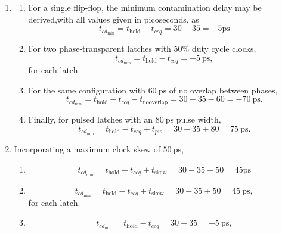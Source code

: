 \documentclass{article}
\begin{document}
\begin{enumerate}[label=\thesubsection]
\begin{enumerate}[label=\alph*)]
		\item For two transparent latches, clock skew has no impact on performance, and so 
			\[
				t_{pd_{\mathrm{max}}} = 2t_{pdq} = 420 \ \mathrm{ps}.
			\]
		\item For pulsed latches, though they are similarly skew-tolerant, this only applies if the pulse is wide enough. In this case, \(t_{pdq}\) is less than the total sequencing overhead, the latches are not \textit{totally} skew-tolerant, and so
			\[
				t_{pd_{\mathrm{max}}} = T_C - (t_{pcq}+t_{\mathrm{setup}} - t_{pw}+t_{\mathrm{skew}}) = 500 - (50 + 25 - 80 + 50) = 500 - 45 = 455 \ \mathrm{ps}.
			\]
	\end{enumerate}
	\setcounter{subsection}{3}
	\item
		\begin{enumerate}[label=\alph*)]
			\item For a single flip-flop, the minimum contamination delay may be derived,with all values given in picoseconds, as
				\[
					t_{cd_{\mathrm{min}}} = t_{\mathrm{hold}} - t_{ccq} = 30-35 = -5 \mathrm{ps}
				\]
			\item For two phase-transparent latches with 50\% duty cycle clocks,
				\[
					t_{cd_{\mathrm{min}}} = t_{\mathrm{hold}} - t_{ccq} = -5 \ \mathrm{ps},
				\]
				for each latch.
			\item For the same configuration with \(60 \ \mathrm{ps}\) of no overlap between phases,
				\[
					t_{cd_{\mathrm{min}}} = t_{\mathrm{hold}} - t_{ccq} - t_{\mathrm{nooverlap}} = 30-35-60 = -70 \ \mathrm{ps}.
				\]
			\item Finally, for pulsed latches with an \(80 \ \mathrm{ps}\) pulse width,
				\[
					t_{cd_{\mathrm{min}}} = t_{\mathrm{hold}} - t_{ccq} + t_{pw} = 30-35+80 = 75 \ \mathrm{ps}.
				\]
		\end{enumerate}
		\setcounter{subsection}{4}
	  \item 
				Incorporating a maximum clock skew of \(50 \ \mathrm{ps}\),
			\begin{enumerate}[label=\alph*)]
				\item
					\[
						t_{cd_{\mathrm{min}}} = t_{\mathrm{hold}} - t_{ccq} + t_{\mathrm{skew}} = 30-35+50 = 45 \mathrm{ps}
					\]
				\item 
				\[
					t_{cd_{\mathrm{min}}} = t_{\mathrm{hold}} - t_{ccq} + t_{\mathrm{skew}} = 30-35+50 = 45 \ \mathrm{ps},
				\]
				for each latch.
				\item 
				\[
					t_{cd_{\mathrm{min}}} = t_{\mathrm{hold}} - t_{ccq} = 30-35 = -5 \ \mathrm{ps},
\]
\end{enumerate}
\end{enumerate}
\end{document}
